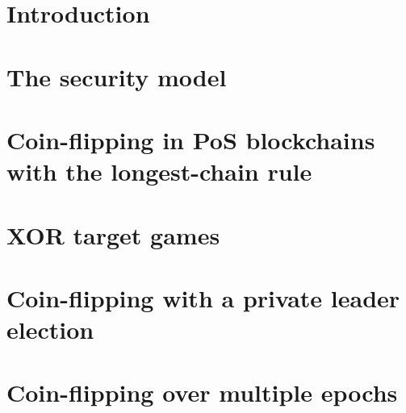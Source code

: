 \documentclass{article}
\begin{document}

\section{Introduction }


\section{The security model}
\label{sec:model}


% 

\section{Coin-flipping in PoS blockchains with the longest-chain rule}
\label{sec:grinding-praos}


\section{XOR target games}
\label{sec:xor-games}


\section{Coin-flipping with a private leader election}
\label{sec:coin-tossing}


\section{Coin-flipping over multiple epochs}
\label{sec:composing-xor-games}\label{sec:beacon}


% 

% 
\end{document}
